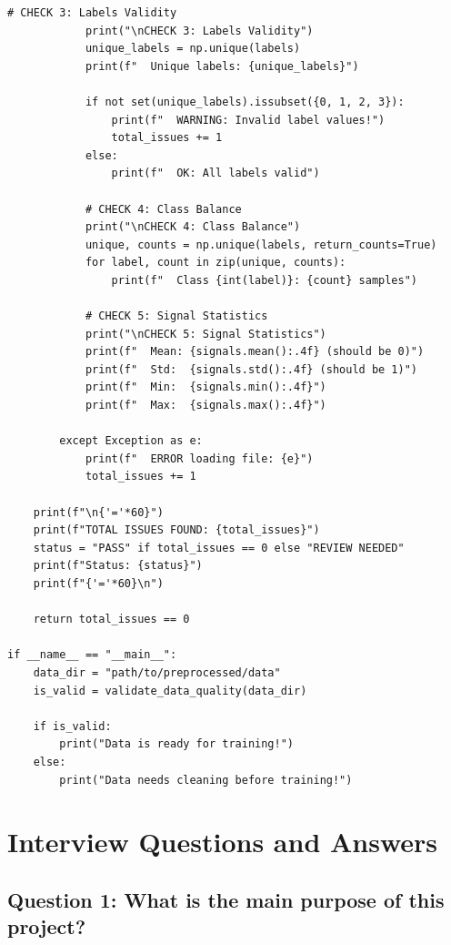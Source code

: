 \documentclass[12pt,a4paper]{article}
\begin{document}
\begin{lstlisting}[caption={Complete Validation (Your Main Task)}]
            # CHECK 3: Labels Validity
            print("\nCHECK 3: Labels Validity")
            unique_labels = np.unique(labels)
            print(f"  Unique labels: {unique_labels}")
            
            if not set(unique_labels).issubset({0, 1, 2, 3}):
                print(f"  WARNING: Invalid label values!")
                total_issues += 1
            else:
                print(f"  OK: All labels valid")
            
            # CHECK 4: Class Balance
            print("\nCHECK 4: Class Balance")
            unique, counts = np.unique(labels, return_counts=True)
            for label, count in zip(unique, counts):
                print(f"  Class {int(label)}: {count} samples")
            
            # CHECK 5: Signal Statistics
            print("\nCHECK 5: Signal Statistics")
            print(f"  Mean: {signals.mean():.4f} (should be 0)")
            print(f"  Std:  {signals.std():.4f} (should be 1)")
            print(f"  Min:  {signals.min():.4f}")
            print(f"  Max:  {signals.max():.4f}")
            
        except Exception as e:
            print(f"  ERROR loading file: {e}")
            total_issues += 1
    
    print(f"\n{'='*60}")
    print(f"TOTAL ISSUES FOUND: {total_issues}")
    status = "PASS" if total_issues == 0 else "REVIEW NEEDED"
    print(f"Status: {status}")
    print(f"{'='*60}\n")
    
    return total_issues == 0

if __name__ == "__main__":
    data_dir = "path/to/preprocessed/data"
    is_valid = validate_data_quality(data_dir)
    
    if is_valid:
        print("Data is ready for training!")
    else:
        print("Data needs cleaning before training!")
\end{lstlisting}

\section{Interview Questions and Answers}

\subsection{Question 1: What is the main purpose of this project?}
\end{document}
